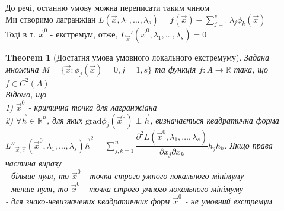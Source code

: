 \documentclass[a4paper, 14pt]{extarticle}
\def\huge{\displaystyle}
\theoremstyle{theoremdd}
\newtheorem{theorem}{Theorem}[subsection]
\theoremstyle{theoremdd}
\theoremstyle{theoremdd}
\theoremstyle{theoremdd}
\theoremstyle{theoremdd}
\theoremstyle{theoremdd}
\theoremstyle{theoremdd}
\theoremstyle{theoremdd}
\begin{document}
До речі, останню умову можна переписати таким чином\\
Ми створимо лагранжіан $L(\vec{x}, \lambda_1, \dots, \lambda_s) = f(\vec{x}) - \huge \sum_{j=1}^s \lambda_j \phi_k(\vec{x})$\\
Тоді в т. $\vec{x}^0$ - екстремум, отже, $L_{\vec{x}}'(\vec{x}^0,\lambda_1,\dots,\lambda_s)=0$\\

\begin{theorem}[Достатня умова умовного локального екстремуму]
Задана множина $M=\{\vec{x}: \phi_j(\vec{x}) =0, j = \overline{1,s} \}$ та функція $f: A \to \mathbb{R}$ така, що $f \in C^2(A)$\\
Відомо, що \\
1) $\vec{x}^0$ - критична точка для лагранжіана\\
2) $\forall \vec{h} \in \mathbb{R}^n$, для яких $\textrm{grad} \phi_j(\vec{x}^0) \perp \vec{h}$, визначається квадратична форма\\
$L''_{\vec{x},\vec{x}}(\vec{x}^0, \lambda_1, \dots, \lambda_s) \vec{h}^2 = \huge \sum_{j,k=1}^n \dfrac{\partial^2 L(\vec{x}^0, \lambda_1, \dots, \lambda_s)}{\partial x_j \partial x_k} h_j h_k$. Якщо права частина виразу\\
- більше нуля, то $\vec{x}^0$ - точка строго умного локального мінімуму\\
- менше нуля, то $\vec{x}^0$ - точка строго умного локального мінімуму\\
- для знако-невизначених квадратичних форм $\vec{x}^0$ - не умовний екстремум
\end{theorem}
\end{document}
